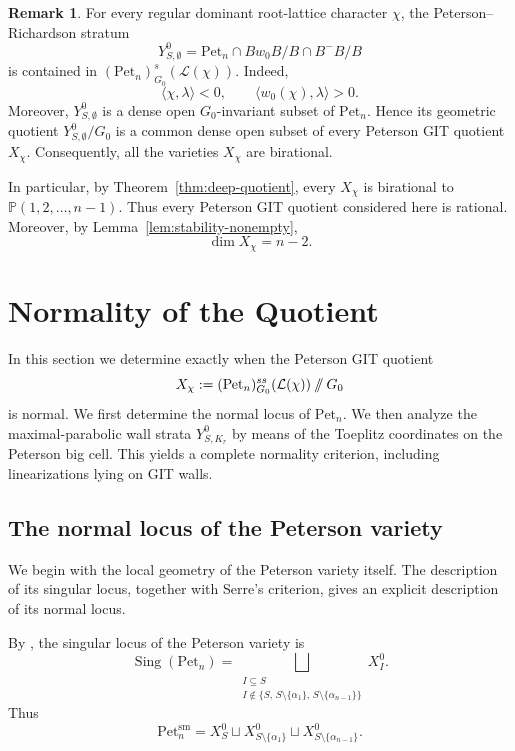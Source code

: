 \documentclass[12pt, reqno]{amsart}
\newcommand{\sslash}{\mathbin{/\mkern-6mu/}}
\theoremstyle{plain}
\numberwithin{equation}{section}
\theoremstyle{definition}
\newtheorem{remark}{Remark}
\begin{document}
\begin{remark}\label{rem:quotients-birational}
For every regular dominant root-lattice character \(\chi\), the
Peterson--Richardson stratum
\[
Y^0_{S,\emptyset}
=
\mathrm{Pet}_n\cap Bw_0B/B\cap B^-B/B
\]
is contained in $(\mathrm{Pet}_n)^s_{G_0}(\mathcal L(\chi)).$
Indeed,
\[
\langle\chi,\lambda\rangle<0,
\qquad
\langle w_0(\chi),\lambda\rangle>0.
\]
Moreover, \(Y^0_{S,\emptyset}\) is a dense open \(G_0\)-invariant
subset of \(\mathrm{Pet}_n\). Hence its geometric quotient $Y^0_{S,\emptyset}/G_0$ is a common dense open subset of every Peterson GIT quotient
\(X_\chi\). Consequently, all the varieties \(X_\chi\) are
birational.

In particular, by Theorem~\ref{thm:deep-quotient}, every \(X_\chi\)
is birational to $\mathbb P(1,2,\ldots,n-1).$
Thus every Peterson GIT quotient considered here is rational.
Moreover, by Lemma~\ref{lem:stability-nonempty},
\[
\dim X_\chi=n-2.
\]
\end{remark}

\section{Normality of the Quotient}
\label{sec:normality}

In this section we determine exactly when the Peterson GIT quotient
\[
X_\chi
:=
(\mathrm{Pet}_n)^{ss}_{G_0}(\mathcal L(\chi))
\sslash G_0
\]
is normal. We first determine the normal locus of
\(\mathrm{Pet}_n\). We then analyze the maximal-parabolic wall strata
\(Y^0_{S,K_r}\) by means of the Toeplitz coordinates on the Peterson
big cell. This yields a complete normality criterion, including
linearizations lying on GIT walls.

\subsection{The normal locus of the Peterson variety} We begin with the local geometry of the Peterson variety itself.
The description of its singular locus, together with Serre's
criterion, gives an explicit description of its normal locus.

By \cite[Theorem~4]{Insko}, the singular locus of the Peterson variety is
\[
\operatorname{Sing}(\mathrm{Pet}_n)
=
\bigsqcup_{\substack{I\subseteq S\\
I\notin
\{S,\,
S\setminus\{\alpha_1\},\,
S\setminus\{\alpha_{n-1}\}\}}}
X_I^0.
\]
Thus
\[
\mathrm{Pet}_n^{\mathrm{sm}}
=
X_S^0
\sqcup
X_{S\setminus\{\alpha_1\}}^0
\sqcup
X_{S\setminus\{\alpha_{n-1}\}}^0.
\]
\end{document}
